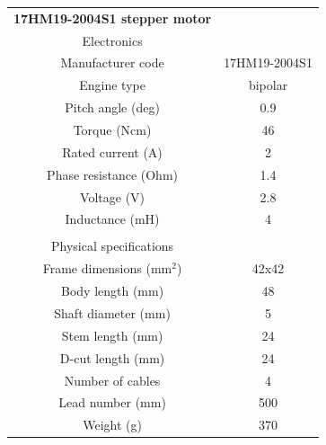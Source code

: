 \documentclass{article}
\begin{document}
\begin{multicols}{2}
        \begin{minipage}{0.5\textwidth}
            \centering
            \begin{tabular}{cc}
                \textbf{17HM19-2004S1 stepper motor}&\\
                Electronics&\\
                \hline
                Manufacturer code & 17HM19-2004S1\\
                Engine type & bipolar\\
                Pitch angle (deg) & 0.9 \\
                Torque (Ncm)& 46\\
                Rated current (A) & 2\\
                Phase resistance (Ohm)& 1.4\\
                Voltage (V)& 2.8\\
                Inductance (mH)& 4\\
                 & \\
                Physical specifications&\\
                \hline
                Frame dimensions (mm\(^2\))& 42x42 \\
                Body length (mm)& 48 \\
                Shaft diameter (mm)& 5 \\
                Stem length (mm)& 24 \\
                D-cut length (mm)& 24 \\
                Number of cables & 4\\
                Lead number (mm)& 500 \\
                Weight (g) & 370\\
                \hline
            \end{tabular}
            \label{tab:nema_17_specifics_2}
        \end{minipage}


\end{multicols}
\end{document}
